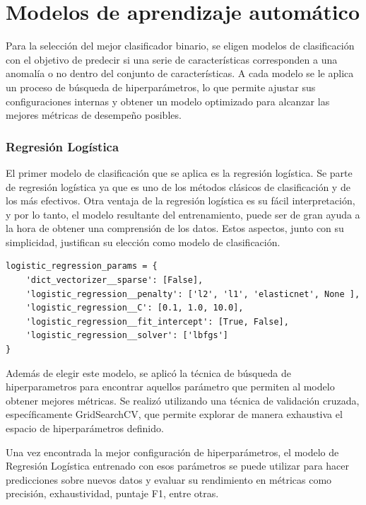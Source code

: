 \documentclass[11pt,a4paper,spanish]{book}
\numberwithin{equation}{chapter}
\numberwithin{figure}{chapter}
\begin{document}
\section{Modelos de aprendizaje automático}

Para la selección del mejor clasificador binario, se eligen modelos de clasificación 
con el objetivo de predecir si una serie de características corresponden a una anomalía 
o no dentro del conjunto de características. A cada modelo se le aplica un proceso de 
búsqueda de hiperparámetros, lo que permite ajustar sus configuraciones internas y 
obtener un modelo optimizado para alcanzar las mejores métricas de desempeño posibles. 


\subsubsection{Regresión Logística}

El primer modelo de clasificación que se aplica es la regresión logística. Se parte de  
regresión logística ya que es uno de los métodos clásicos de clasificación y de los  más 
efectivos. Otra ventaja de la regresión logística es su fácil interpretación, y por lo 
tanto, el modelo resultante del entrenamiento, puede ser de gran ayuda a la hora de 
obtener una comprensión de los datos. Estos aspectos, junto con su simplicidad, 
justifican su elección como modelo de clasificación.


\vspace{5mm}
\begin{lstlisting}
logistic_regression_params = {
    'dict_vectorizer__sparse': [False],
    'logistic_regression__penalty': ['l2', 'l1', 'elasticnet', None ],
    'logistic_regression__C': [0.1, 1.0, 10.0],
    'logistic_regression__fit_intercept': [True, False],
    'logistic_regression__solver': ['lbfgs']
}
\end{lstlisting}


Además de elegir este modelo, se aplicó la técnica de búsqueda de hiperparametros para 
encontrar aquellos parámetro que permiten al modelo obtener mejores métricas. Se realizó 
utilizando una técnica de validación cruzada, específicamente GridSearchCV, que permite 
explorar de manera exhaustiva el espacio de hiperparámetros definido.

Una vez encontrada la mejor configuración de hiperparámetros, el modelo de Regresión 
Logística entrenado con esos parámetros se puede utilizar para hacer predicciones sobre 
nuevos datos y evaluar su rendimiento en métricas como precisión, exhaustividad, 
puntaje F1, entre otras.
\end{document}
